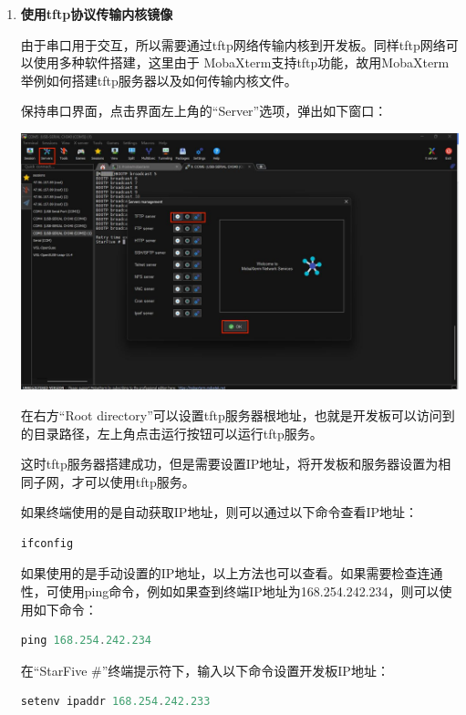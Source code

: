 {\begin{enumerate}
	
	\raggedright
	
	此时开发板和终端已通过串口连接，终端可以使用命令与开发板进行交互。
	
	\item \textbf{使用tftp协议传输内核镜像}
	
	由于串口用于交互，所以需要通过tftp网络传输内核到开发板。同样tftp网络可以使用多种软件搭建，这里由于
	MobaXterm支持tftp功能，故用MobaXterm举例如何搭建tftp服务器以及如何传输内核文件。
	
	保持串口界面，点击界面左上角的“Server”选项，弹出如下窗口：
	
	\centering
	\includegraphics[width=0.9\linewidth]{figures/08-02-tftp服务器搭建.jpg}
	
	
	\raggedright
	
	在右方“Root directory”可以设置tftp服务器根地址，也就是开发板可以访问到的目录路径，左上角点击运行按钮可以运行tftp服务。
	
	这时tftp服务器搭建成功，但是需要设置IP地址，将开发板和服务器设置为相同子网，才可以使用tftp服务。
	
	如果终端使用的是自动获取IP地址，则可以通过以下命令查看IP地址：
	
	\begin{lstlisting}[language={Rust}]
		ifconfig
	\end{lstlisting}
	
	
	如果使用的是手动设置的IP地址，以上方法也可以查看。如果需要检查连通性，可使用ping命令，例如如果查到终端IP地址为168.254.242.234，则可以使用如下命令：
	
	\begin{lstlisting}[language={Rust}]
	ping 168.254.242.234
	\end{lstlisting}
	
	
	在“StarFive \#”终端提示符下，输入以下命令设置开发板IP地址：
	
	\begin{lstlisting}[language={Rust}]
	setenv ipaddr 168.254.242.233
	\end{lstlisting}
	

\end{enumerate}}
